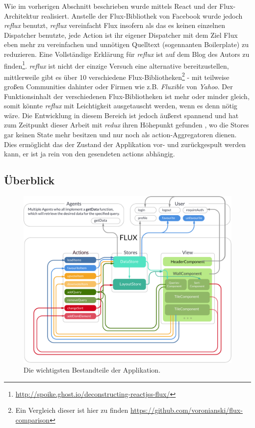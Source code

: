 \documentclass[12pt,twoside]{book}
\begin{document}
Wie im vorherigen Abschnitt beschrieben wurde mittels React und der Flux-Architektur realisiert. Anstelle der Flux-Bibliothek von Facebook wurde jedoch \textit{reflux} benutzt, \textit{reflux} vereinfacht Flux insofern als das es keinen einzelnen Dispatcher benutzte, jede Action ist ihr eigener Dispatcher mit dem Ziel Flux eben mehr zu vereinfachen und unnötigen Quelltext (sogennanten Boilerplate) zu reduzieren. Eine Vollständige Erklärung für \textit{reflux} ist auf dem Blog des Autors zu finden\footnote{\url{http://spoike.ghost.io/deconstructing-reactjss-flux/}}. \textit{reflux} ist nicht der einzige Versuch eine alternative bereitzustellen, mittlerweile gibt es über 10 verschiedene Flux-Bibliotheken\footnote{Ein Vergleich dieser ist hier zu finden \url{https://github.com/voronianski/flux-comparison}} - mit teilweise großen Communities dahinter oder Firmen wie z.B. \textit{Fluxible} von \textit{Yahoo}. Der Funktionsinhalt der verschiedenen Flux-Bibliotheken ist mehr oder minder gleich, somit könnte \textit{reflux} mit Leichtigkeit ausgetauscht werden, wenn es denn nötig wäre.
Die Entwicklung in diesem Bereich ist jedoch äußerst spannend und hat zum Zeitpunkt dieser Arbeit mit \textit{redux} ihren Höhepunkt gefunden \citep{redux}, wo die Stores gar keinen State mehr besitzen und nur noch als action-Aggregatoren dienen. Dies ermöglicht das der Zustand der Applikation vor- und zurückgespult werden kann, er ist ja rein von den gesendeten actions abhängig.

\subsection{Überblick}

\begin{figure}[H]
    \centering
    \includegraphics[width=1.0\textwidth]{images/architecture.pdf}
    \caption{Die wichtigsten Bestandteile der Applikation.}
    \label{fig:awesome_image}
\end{figure}
\end{document}
